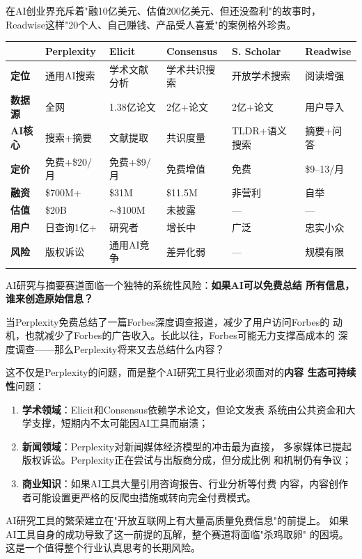 在AI创业界充斥着"融10亿美元、估值200亿美元、但还没盈利"的故事时，
Readwise这样"20个人、自己赚钱、产品受人喜爱"的案例格外珍贵。

\begin{keybox}[AI研究与摘要工具对比]
\small
\begin{tabularx}{\textwidth}{l X X X X X}
\toprule
\rowcolor{figLightGray}
& \textbf{Perplexity} & \textbf{Elicit} & \textbf{Consensus} &
  \textbf{S. Scholar} & \textbf{Readwise} \\
\midrule
\textbf{定位} & 通用AI搜索 & 学术文献分析 & 学术共识搜索 &
  开放学术搜索 & 阅读增强 \\
\textbf{数据源} & 全网 & 1.38亿论文 & 2亿+论文 & 2亿+论文 &
  用户导入 \\
\textbf{AI核心} & 搜索+摘要 & 文献提取 & 共识度量 & TLDR+语义搜索 &
  摘要+问答 \\
\textbf{定价} & 免费+\$20/月 & 免费+\$9/月 & 免费增值 & 免费 &
  \$9--13/月 \\
\textbf{融资} & \$700M+ & \$31M & \$11.5M & 非营利 & 自举 \\
\textbf{估值} & \$20B & $\sim$\$100M & 未披露 & --- & --- \\
\textbf{用户} & 日查询1亿+ & 研究者 & 增长中 & 广泛 &
  忠实小众 \\
\textbf{风险} & 版权诉讼 & 通用AI竞争 & 差异化弱 & --- & 规模有限 \\
\bottomrule
\end{tabularx}
\end{keybox}

\begin{warnbox}
AI研究与摘要赛道面临一个独特的系统性风险：\textbf{如果AI可以免费总结
所有信息，谁来创造原始信息？}

当Perplexity免费总结了一篇Forbes深度调查报道，减少了用户访问Forbes的
动机，也就减少了Forbes的广告收入。长此以往，Forbes可能无力支撑高成本的
深度调查——那么Perplexity将来又去总结什么内容？

这不仅是Perplexity的问题，而是整个AI研究工具行业必须面对的\textbf{内容
生态可持续性}问题：

\begin{enumerate}
  \item \textbf{学术领域}：Elicit和Consensus依赖学术论文，但论文发表
    系统由公共资金和大学支撑，短期内不太可能因AI工具而崩溃；
  \item \textbf{新闻领域}：Perplexity对新闻媒体经济模型的冲击最为直接，
    多家媒体已提起版权诉讼。Perplexity正在尝试与出版商分成，但分成比例
    和机制仍有争议；
  \item \textbf{商业知识}：如果AI工具大量引用咨询报告、行业分析等付费
    内容，内容创作者可能设置更严格的反爬虫措施或转向完全付费模式。
\end{enumerate}

AI研究工具的繁荣建立在"开放互联网上有大量高质量免费信息"的前提上。
如果AI工具自身的成功导致了这一前提的瓦解，整个赛道将面临"杀鸡取卵"
的困境。这是一个值得整个行业认真思考的长期风险。
\end{warnbox}


